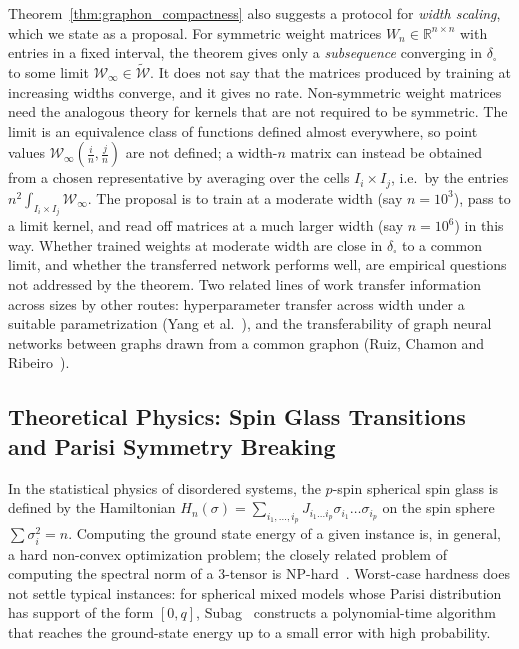 \documentclass[11pt,a4paper,reqno]{amsart}
\theoremstyle{definition}
\numberwithin{equation}{section}
\newcommand{\R}{\mathbb{R}}
\begin{document}
Theorem~\ref{thm:graphon_compactness} also suggests a protocol for \emph{width scaling}, which we state as a proposal. For symmetric weight matrices $W_n \in \R^{n \times n}$ with entries in a fixed interval, the theorem gives only a \emph{subsequence} converging in $\delta_\square$ to some limit $\mathcal{W}_\infty \in \widetilde{\mathcal{W}}$. It does not say that the matrices produced by training at increasing widths converge, and it gives no rate. Non-symmetric weight matrices need the analogous theory for kernels that are not required to be symmetric. The limit is an equivalence class of functions defined almost everywhere, so point values $\mathcal{W}_\infty(\frac{i}{n}, \frac{j}{n})$ are not defined; a width-$n$ matrix can instead be obtained from a chosen representative by averaging over the cells $I_i \times I_j$, i.e.\ by the entries $n^2 \int_{I_i \times I_j} \mathcal{W}_\infty$. The proposal is to train at a moderate width (say $n = 10^3$), pass to a limit kernel, and read off matrices at a much larger width (say $n = 10^6$) in this way. Whether trained weights at moderate width are close in $\delta_\square$ to a common limit, and whether the transferred network performs well, are empirical questions not addressed by the theorem. Two related lines of work transfer information across sizes by other routes: hyperparameter transfer across width under a suitable parametrization (Yang et al.~\cite{yang2022tensor}), and the transferability of graph neural networks between graphs drawn from a common graphon (Ruiz, Chamon and Ribeiro~\cite{ruiz2020graphon}).

\subsection{Theoretical Physics: Spin Glass Transitions and Parisi Symmetry Breaking}
\label{subsec:imp_physics}
In the statistical physics of disordered systems, the $p$-spin spherical spin glass is defined by the Hamiltonian $H_n(\sigma) = \sum_{i_1, \dots, i_p} J_{i_1 \dots i_p} \sigma_{i_1} \dots \sigma_{i_p}$ on the spin sphere $\sum \sigma_i^2 = n$. Computing the ground state energy of a given instance is, in general, a hard non-convex optimization problem; the closely related problem of computing the spectral norm of a $3$-tensor is NP-hard~\cite{hillar2013most}. Worst-case hardness does not settle typical instances: for spherical mixed models whose Parisi distribution has support of the form $[0,q]$, Subag~\cite{subag2021following} constructs a polynomial-time algorithm that reaches the ground-state energy up to a small error with high probability.
\end{document}
